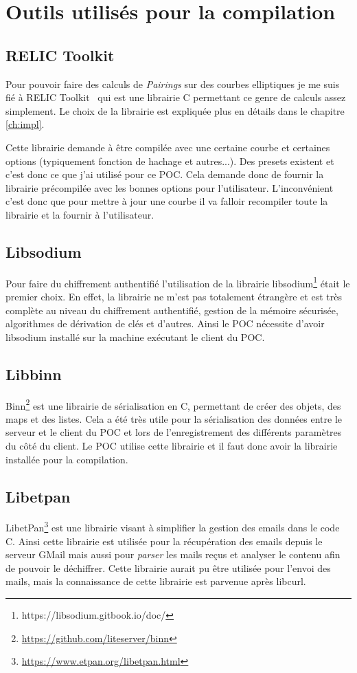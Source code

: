 \chapter{Outils utilisés pour la compilation}

\section{RELIC Toolkit}
Pour pouvoir faire des calculs de \textit{Pairings} sur des courbes elliptiques je me suis fié à RELIC Toolkit~\cite{relic-toolkit} qui est une librairie C permettant ce genre de calculs assez simplement. Le choix de la librairie est expliquée plus en détails dans le chapitre \ref{ch:impl}.

Cette librairie demande à être compilée avec une certaine courbe et certaines options (typiquement fonction de hachage et autres...). Des presets existent et c'est donc ce que j'ai utilisé pour ce POC. Cela demande donc de fournir la librairie précompilée avec les bonnes options pour l'utilisateur. L'inconvénient c'est donc que pour mettre à jour une courbe il va falloir recompiler toute la librairie et la fournir à l'utilisateur.
\section{Libsodium}
Pour faire du chiffrement authentifié l'utilisation de la librairie  libsodium\footnote{https://libsodium.gitbook.io/doc/} était le premier choix. En effet, la librairie ne m'est pas totalement étrangère et est très complète au niveau du chiffrement authentifié, gestion de la mémoire sécurisée, algorithmes de dérivation de clés et d'autres. Ainsi le POC nécessite d'avoir libsodium installé sur la machine exécutant le client du POC.
\section{Libbinn}
Binn\footnote{\url{https://github.com/liteserver/binn}} est une librairie de sérialisation en C, permettant de créer des objets, des maps et des listes. Cela a été très utile pour la sérialisation des données entre le serveur et le client du POC et lors de l'enregistrement des différents paramètres du côté du client. Le POC utilise cette librairie et il faut donc avoir la librairie installée pour la compilation.
\section{Libetpan}
LibetPan\footnote{\url{https://www.etpan.org/libetpan.html}} est une librairie visant à simplifier la gestion des emails dans le code C. Ainsi cette librairie est utilisée pour la récupération des emails depuis le serveur GMail mais aussi pour \textit{parser} les mails reçus et analyser le contenu afin de pouvoir le déchiffrer. Cette librairie aurait pu être utilisée pour l'envoi des mails, mais la connaissance de cette librairie est parvenue après libcurl.
